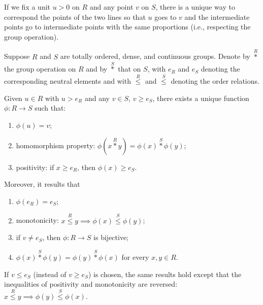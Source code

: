 If we fix a unit $u>0$ on $R$ and any point $v$ on $S$, there is a unique way to
correspond the points of the two lines so that $u$ goes to $v$ and the
intermediate points go to intermediate points with the same proportions (i.e.,
respecting the group operation).

\begin{theorem}%
  \label{th:isomorfismo}%
    Suppose $R$ and $S$ are totally ordered, dense, and continuous groups.
  Denote by $\stackrel R*$ the group operation on $R$ and by $\stackrel S*$ that
  on $S$, with $e_R$ and $e_S$ denoting the corresponding neutral elements and
  with $\stackrel R\le$ and $\stackrel S\le$ denoting the order relations.

    Given $u\in R$ with $u > e_R$ and any $v \in S$, $v \ge e_S$, there exists a
  unique function $\phi\colon R\to S$ such that:
  \begin{enumerate}
    \item $\phi(u)=v$;
    \item homomorphism property: 
    $\phi(x \stackrel R* y) = \phi(x) \stackrel S* \phi(y)$;
    \item positivity:
    if $x\ge e_R$, then $\phi(x) \ge e_S$. 
  \end{enumerate}
  Moreover, it results that 
  \begin{enumerate}
    \item $\phi(e_R)=e_S$;
    \item monotonicity: 
    $x\stackrel R\le y \implies \phi(x) \stackrel S\le \phi(y)$;
    \item if $v\neq e_S$, then $\phi\colon R\to S$ is bijective;
    \item $\phi(x) \stackrel S* \phi(y) = \phi(y)\stackrel S*\phi(x)$ for every $x,y\in R$.
  \end{enumerate}

    If $v\le e_S$ (instead of $v\ge e_S$) is chosen, the same results hold
  except that the inequalities of positivity and monotonicity are reversed:
  $x\stackrel R\le y \implies \phi(y) \stackrel S\le \phi(x)$.
\end{theorem}
    

